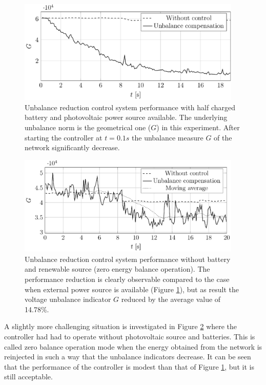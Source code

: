             \begin{figure}[ht]
            \centering
            \includegraphics[width=0.95\textwidth]{Unblance_EPS_Pics/UnbalRedComp_JCP-figure3.eps}
            \caption{Unbalance reduction control system performance with half charged battery and photovoltaic power source available. The underlying unbalance norm is the geometrical one ($G$) in this experiment. After starting the controller at $t=0.1s$ the unbalance measure $G$ of the network significantly decrease.}
            \label{fig:compare_asym_PV}
            \end{figure}

            \begin{figure}[ht]
            \centering
            \includegraphics[width=0.95\textwidth]{Unblance_EPS_Pics/UnbalRedComp_JCP-figure4.eps}
            \caption{Unbalance reduction control system performance without battery and renewable source (zero energy balance operation). The performance reduction is clearly observable compared to the case when external power source is available (Figure \ref{fig:compare_asym_PV}), but as result the voltage unbalance indicator $G$ reduced by the average value of 14.78\%.}
            \label{fig:compare_asym}
            \end{figure}

            A slightly more challenging situation is investigated in Figure \ref{fig:compare_asym} where the controller had had to operate without photovoltaic source and batteries. This is called zero balance operation mode when the energy obtained from the network is reinjected in such a way that the unbalance indicators decrease. It can be seen that the performance of the controller is modest than that of Figure \ref{fig:compare_asym_PV}, but it is still acceptable.

